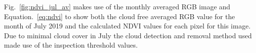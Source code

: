 Fig.~\ref{fig:ndvi_jul_av} makes use of the monthly averaged RGB image and Equation.~\ref{eq:ndvi} to show both the cloud free averaged RGB value for the month of July 2019 and the calculated NDVI values for each pixel for this image. Due to minimal cloud cover in July the cloud detection and removal method used made use of the inspection threshold values.